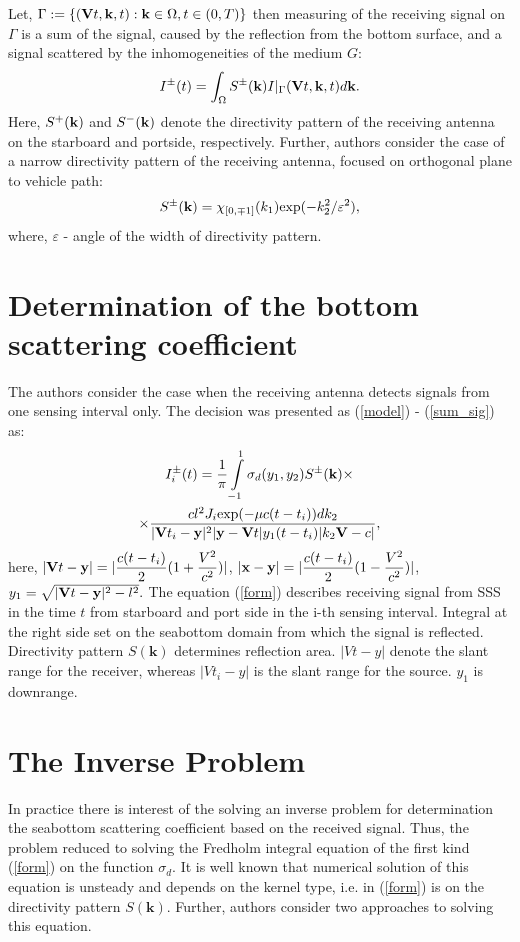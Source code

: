 \documentclass{procDDs}
\begin{document}
Let, $\Gamma := \{ (\mathbf{V}t, \mathbf{k}, t): \mathbf{k} \in \Omega, t \in (0,T) \}$  then measuring of the receiving signal on $\Gamma$ is a sum of the signal, caused by the reflection from the bottom surface, and a signal scattered by the inhomogeneities of the medium $G$:
\begin{multline}
	\label{sum_sig}
	I^\pm(t) = \int_{\Omega} S^\pm(\mathbf{k}) I|_{\Gamma}(\mathbf{V}t, \mathbf{k}, t)d\mathbf{k}.
\end{multline}
Here, $S^+(\mathbf{k})$ and $S^-(\mathbf{k})$ denote the directivity pattern of the receiving antenna on the starboard and portside, respectively. Further, authors consider the case of a narrow directivity pattern of the receiving antenna, focused on orthogonal plane to vehicle path:
\begin{equation}
\label{diagram}
S^\pm(\mathbf{k}) = \chi_{[0,\mp1]}(k_1)  \text{exp}(-k_2^2/\varepsilon^2),
\end{equation}
where, $\varepsilon $ - angle of the width of directivity pattern.

\section{Determination of the bottom scattering coefficient}

The authors consider the case when the receiving antenna detects signals from one sensing interval only. The decision was presented as (\ref{model}) - (\ref{sum_sig}) as:
\begin{multline}
	\label{form}
	I^\pm_i(t) = \frac{1}{\pi}\int\limits_{-1}^{1}\sigma_d(y_1,y_2) S^{\pm}(\mathbf{k}) \times \\ \times
	\frac{ cl^2J_i \text{exp}(-\mu c(t-t_i))dk_2}{|\mathbf{V}t_i-\mathbf{y}|^2|\mathbf{y}-\mathbf{V}t|y_1(t-t_i)|k_2 \mathbf{V}-c|},
\end{multline}
here, $|\mathbf{V}t - \mathbf{y}| = |\dfrac{c(t-t_i)}{2}(1+\dfrac{V^2}{c^2})|$, $|\mathbf{x}-\mathbf{y}| = |\dfrac{c(t-t_i)}{2}(1-\dfrac{V^2}{c^2})|$, $y_1 = \sqrt{|\mathbf{V}t-\mathbf{y}|^2 - l^2}.$
The equation (\ref{form}) describes receiving signal from SSS in the time $t$ from starboard and port side in the i-th sensing interval. Integral at the right side set on the seabottom domain from which the signal is reflected. Directivity pattern $S(\textbf{k})$ determines reflection area. $|Vt-y|$ denote the slant range for the receiver, whereas $|Vt_i-y|$   is the slant range for the source. $y_1$ is downrange.

\section{The Inverse Problem}
In practice there is interest of the solving an inverse problem for determination the seabottom scattering coefficient based on the received signal. Thus, the problem reduced to solving the Fredholm integral equation of the first kind (\ref{form}) on the function $\sigma_d$. It is well known that numerical solution of this equation is unsteady and depends on the kernel type, i.e. in (\ref{form}) is on the directivity pattern $S(\textbf{k})$. Further, authors consider two approaches to solving this equation.
\end{document}
